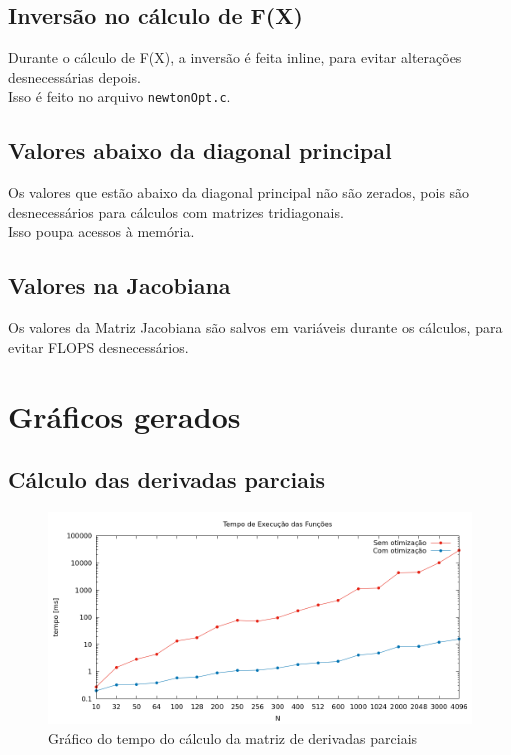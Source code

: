 \documentclass{article}
\begin{document}
\subsection{Inversão no cálculo de F(X)}
Durante o cálculo de F(X), a inversão é feita inline, para evitar alterações desnecessárias depois.\\
Isso é feito no arquivo \texttt{newtonOpt.c}.

\subsection{Valores abaixo da diagonal principal}
Os valores que estão abaixo da diagonal principal não são zerados, pois são desnecessários para cálculos com matrizes tridiagonais.\\
Isso poupa acessos à memória.

\subsection{Valores na Jacobiana}
Os valores da Matriz Jacobiana são salvos em variáveis durante os cálculos, para evitar FLOPS desnecessários.

\newpage
\section{Gráficos gerados}
\subsection{Cálculo das derivadas parciais}

\begin{figure}[htp]
    \centering
    \includegraphics[width=12cm]{tempo_derivadas.png}
    \caption{Gráfico do tempo do cálculo da matriz de derivadas parciais}
    \label{fig:tempo_derivadas}
\end{figure}
\end{document}
